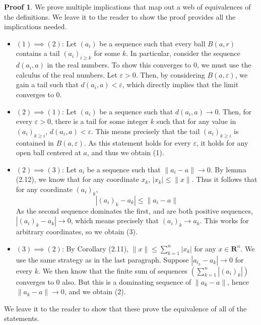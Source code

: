 \documentclass[12pt]{amsbook}
\theoremstyle{plain}
\theoremstyle{definition}
\newtheorem*{prf}{Proof}
\begin{document}
\begin{prf} We prove multiple implications that map out a web of equivalences of the definitions. We leave it to the reader to show the proof provides all the implications needed.

  \begin{itemize}
  \item $(1) \implies (2)$: Let $(a_i)$ be a sequence such that every ball $B(a,r)$ contains a tail $(a_i)_{i \geq k}$ for some $k$. In particular, consider the sequence $d(a_i, a)$ in the real numbers. To show this converges to 0, we must use the calculus of the real numbers. Let $\varepsilon > 0$. Then, by considering $B(a,\varepsilon)$, we gain a tail such that $d(a_i, a) < \varepsilon$, which directly implies that the limit converges to 0.

  \item $(2) \implies (1)$: Let $(a_i)$ be a sequence such that $d(a_i, a) \to 0$. Then, for every $\varepsilon > 0$, there is a tail for some integer $k$ such that for any value in $(a_i)_{k \geq i}$, $d(a_i, a) < \varepsilon$. This means precisely that the tail $(a_i)_{k \geq i}$ is contained in $B(a,\varepsilon)$. As this statement holds for every $\varepsilon$, it holds for any open ball centered at $a$, and thus we obtain (1).

  \item $(2) \implies (3)$: Let $a_i$ be a sequence such that $\| a_i - a \| \to 0$. By lemma (2.12), we know that for any coordinate $x_k$, $|x_k| \leq \| x \|$. Thus it follows that for any coordinate $(a_i)_k$,
  \[ | (a_i)_k - a_k | \leq \| a_i - a \| \]
  As the second sequence dominates the first, and are both positive sequences, $|(a_i)_k - a_k| \to 0$, which means precisely that $(a_i)_k \to a_k$. This works for arbitrary coordinates, so we obtain (3).

  \item $(3) \implies (2)$: By Corollary (2.11), $\| x \| \leq \sum_{k = 1}^n |x_k|$ for any $x \in \mathbf{R}^n$. We use the same strategy as in the last paragraph. Suppose $|a_{i_k} - a_k| \to 0$ for every $k$. We then know that the finite sum of sequences $(\sum_{k = 1}^n |(a_i)_k|)$ converges to 0 also. But this is a dominating sequence of $\| a_k - a \|$, hence $\| a_k - a \| \to 0$, and we obtain (2).
  \end{itemize}
  We leave it to the reader to show that these prove the equivalence of all of the statements.
\end{prf}
\end{document}

